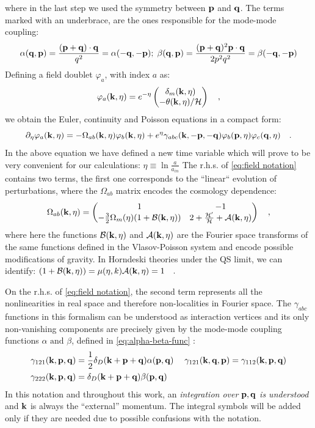 where in the last step we used the symmetry between $\mathbf{p}$ and $\mathbf{q}$.
The terms marked with an underbrace, are the ones responsible for
the mode-mode coupling:
\begin{equation}
\alpha(\mathbf{q},\mathbf{p})=\frac{(\mathbf{p}+\mathbf{q})\cdot\mathbf{q}}{q^{2}}=\alpha(-\mathbf{q},-\mathbf{p});\;\beta(\mathbf{q},\mathbf{p})=\frac{(\mathbf{p}+\mathbf{q})^{2}\mathbf{p}\cdot\mathbf{q}}{2p^{2}q^{2}}=\beta(-\mathbf{q},-\mathbf{p})\label{eq:alpha-beta-func}
\end{equation}
Defining a field doublet $\varphi_a$, with index $a$ as: 
\begin{equation}
\varphi_{a}(\mathbf{k},\eta)=e^{-\eta}\begin{pmatrix}\delta_{m}(\mathbf{k},\eta)\\ -\theta(\mathbf{k},\eta)/\mathcal{H} \end{pmatrix} \quad,\label{eq:field-doublet}
\end{equation}
we obtain the Euler, continuity and Poisson equations in a compact form:
\begin{equation}\label{eq:field notation}
\partial_{\eta}\varphi_{a}(\mathbf{k},\eta)=-\Omega_{ab}(\mathbf{k},\eta)\varphi_{b}(\mathbf{k},\eta)+e^{\eta}\gamma_{abc}(\mathbf{k},\mathbf{-p},\mathbf{-q})\varphi_{b}(\mathbf{p},\eta)\varphi_{c}(\mathbf{q},\eta) \quad.
\end{equation}
In the above equation we have defined a new time variable which will prove to be very convenient for our calculations:
\beeqp$ 
\eta\equiv\ln\frac{a}{a_{in}}
$
The r.h.s. of  \cref{eq:field notation} contains two terms, the first one
corresponds to the ``linear`` evolution of perturbations, where the $\Omega_{ab}$
matrix encodes the cosmology dependence:
\begin{equation}\label{eq:general-Omega-Matrix}
\Omega_{ab}(\mathbf{k},\eta)=\begin{pmatrix}1 & -1\\
-\frac{3}{2}\Omega_{m}(\eta)(1+\mathcal{B}(\mathbf{k},\eta)) & 2+\frac{\mathcal{H}'}{\mathcal{H}}+\mathcal{A}(\mathbf{k},\eta)
\end{pmatrix} \quad,
\end{equation}
where here the functions $\mathcal{B}(\mathbf{k},\eta)$ and $\mathcal{A}(\mathbf{k},\eta)$ are the Fourier space
transforms of the same functions defined in the Vlasov-Poisson system 
and encode possible modifications of gravity.
In Horndeski theories under the QS limit, we can identify:
\beeqal$
(1+\mathcal{B}(\mathbf{k},\eta)) = \mu(\eta,k) \\
\mathcal{A}(\mathbf{k},\eta) = 1 \quad.
$

On the r.h.s. of  \cref{eq:field notation}, the second term represents
all the nonlinearities in real space and therefore non-localities in Fourier space.
The $\gamma_{abc}$ functions
in this formalism can be understood as interaction vertices and its
only non-vanishing components are precisely given by the mode-mode
coupling functions $\alpha \textrm{ and } \beta$, defined in \cref{eq:alpha-beta-func} : 
\begin{align}
\gamma_{121}(\mathbf{k},\mathbf{p},\mathbf{q}) & =\frac{1}{2}\delta_{D}(\mathbf{k}+\mathbf{p}+\mathbf{q})\alpha(\mathbf{p},\mathbf{q}) & \;\gamma_{121}(\mathbf{k},\mathbf{q},\mathbf{p})=\gamma_{112}(\mathbf{k},\mathbf{p},\mathbf{q})\label{eq:coupling-vertices}\\
\gamma_{222}(\mathbf{k},\mathbf{p},\mathbf{q}) & =\delta_{D}(\mathbf{k}+\mathbf{p}+\mathbf{q})\beta(\mathbf{p},\mathbf{q})\nonumber 
\end{align}
In this notation and throughout this work, an \emph{integration over} $\mathbf{p},\mathbf{q}$
\emph{is understood} and $\mathbf{k}$ is always the ``external'' momentum.
The integral symbols will be added only if they are needed due to possible confusions
with the notation.

